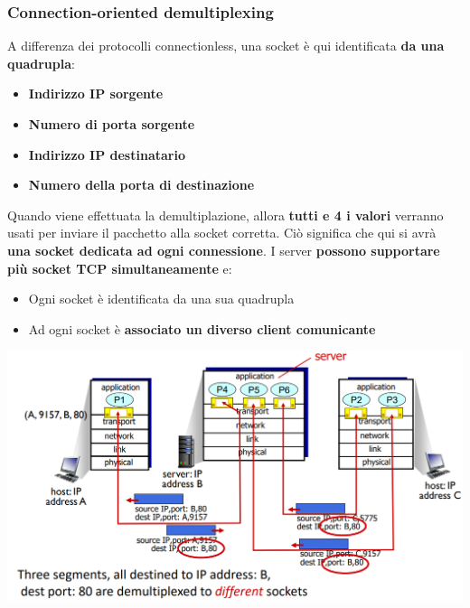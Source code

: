 \documentclass[12pt]{article}
\begin{document}
\subsubsection{Connection-oriented demultiplexing}
A differenza dei protocolli connectionless, una socket è qui identificata \textbf{da una quadrupla}:\
\begin{itemize}
    \item \textbf{Indirizzo IP sorgente}
    \item \textbf{Numero di porta sorgente}
    \item \textbf{Indirizzo IP destinatario}
    \item \textbf{Numero della porta di destinazione}
\end{itemize}
Quando viene effettuata la demultiplazione, allora \textbf{tutti e 4 i valori} verranno usati per inviare il pacchetto alla socket corretta.
Ciò significa che qui si avrà \textbf{una socket dedicata ad ogni connessione}. I server \textbf{possono supportare più socket TCP simultaneamente} e:\
\begin{itemize}
    \item Ogni socket è identificata da una sua quadrupla
    \item Ad ogni socket è \textbf{associato un diverso client comunicante}
\end{itemize}
\begin{center}
    \includegraphics[width = 0.90\linewidth]{Images/42.png}
\end{center}
\end{document}
